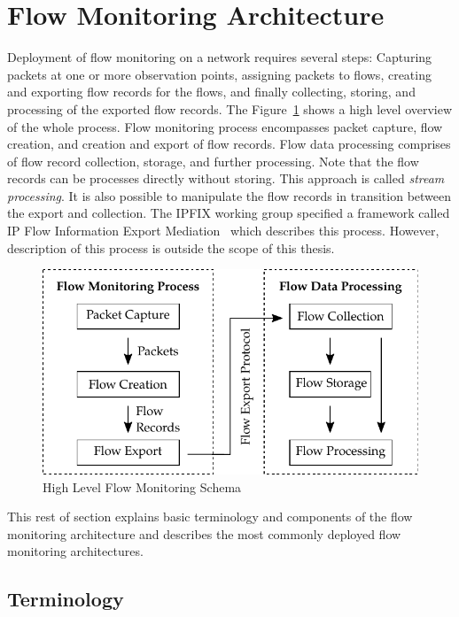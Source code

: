 \section{Flow Monitoring Architecture}

Deployment of flow monitoring on a network requires several steps: Capturing packets at one or more observation points, assigning packets to flows, creating and exporting flow records for the flows, and finally collecting, storing, and processing of the exported flow records. 
The Figure~\ref{fig:flow-monitoring-process} shows a high level overview of the whole process. Flow monitoring process encompasses packet capture, flow creation, and creation and export of flow records. Flow data processing comprises of flow record collection, storage, and further processing. Note that the flow records can be processes directly without storing. This approach is called \emph{stream processing}. It is also possible to manipulate the flow records in transition between the export and collection. The IPFIX working group specified a framework called IP Flow Information Export Mediation~\cite{rfc6183} which describes this process. However, description of this process is outside the scope of this thesis.

\begin{figure}[t!]
  \begin{center}
    \includegraphics{figures/flow-monitoring-process}
  \end{center}
  \caption{High Level Flow Monitoring Schema}
  \label{fig:flow-monitoring-process}
\end{figure}

This rest of section explains basic terminology and components of the flow monitoring architecture and describes the most commonly deployed flow monitoring architectures.

\subsection{Terminology}

